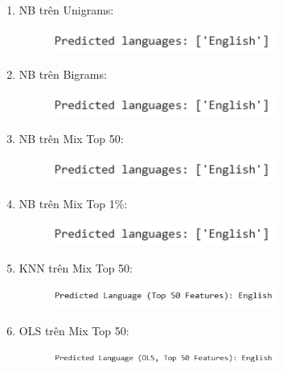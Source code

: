 \begin{enumerate}
    \item NB trên Unigrams:
    \begin{figure}[H]
    \centering
    \includegraphics[width=0.7\textwidth]{img/docspics/Picture54.png}
\end{figure}
    \item NB trên Bigrams:
    \begin{figure}[H]
    \centering
    \includegraphics[width=0.7\textwidth]{img/docspics/Picture55.png}
\end{figure}
    \item NB trên Mix Top 50:
    \begin{figure}[H]
    \centering
    \includegraphics[width=0.7\textwidth]{img/docspics/Picture56.png}
\end{figure}
    \item NB trên Mix Top 1\%:
    \begin{figure}[H]
    \centering
    \includegraphics[width=0.7\textwidth]{img/docspics/Picture57.png}
\end{figure}
    \item KNN trên Mix Top 50:
    \begin{figure}[H]
    \centering
    \includegraphics[width=0.7\textwidth]{img/docspics/Picture58.png}
\end{figure}
    \item OLS trên Mix Top 50:
    \begin{figure}[H]
    \centering
    \includegraphics[width=0.7\textwidth]{img/docspics/Picture59.png}
\end{figure}

\end{enumerate}
